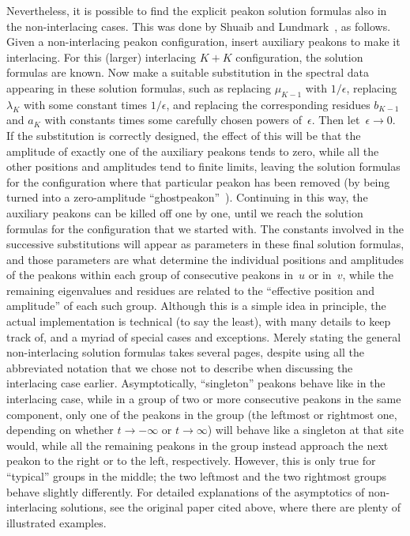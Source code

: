 \documentclass[10pt,a4paper]{article} \pdfoutput=1 
\begin{document}
Nevertheless, it is possible to find the explicit peakon solution formulas also in the
non-interlacing cases. This was done by Shuaib and
Lundmark~\cite{shuaib-lundmark:2019:GX-noninterlacing},
as follows.
Given a non-interlacing peakon configuration, insert auxiliary peakons
to make it interlacing.
For this (larger) interlacing $K+K$ configuration, the solution formulas are known.
Now make a suitable substitution in the spectral data appearing in these solution
formulas, such as replacing $\mu_{K-1}$ with $1/\epsilon$,
replacing $\lambda_K$ with some constant times $1/\epsilon$,
and replacing the corresponding residues $b_{K-1}$ and $a_K$ with
constants times some carefully chosen powers of~$\epsilon$.
Then let~$\epsilon \to 0$.
If the substitution is correctly designed, the effect of this will be that the amplitude of
exactly one of the auxiliary peakons tends to zero, while all the other positions and
amplitudes tend to finite limits,
leaving the solution formulas for the configuration where that particular peakon has been removed
(by being turned into a zero-amplitude ``ghostpeakon''~\cite{lundmark-shuaib:2019:ghostpeakons}).
Continuing in this way, the auxiliary peakons can be killed off one by one,
until we reach the solution formulas for the configuration that we started with.
The constants involved in the successive substitutions will appear as
parameters in these final solution formulas,
and those parameters are what determine the individual positions and amplitudes
of the peakons within each group of consecutive peakons in~$u$ or in~$v$,
while the remaining eigenvalues and residues are related to the ``effective position
and amplitude'' of each such group.
Although this is a simple idea in principle,
the actual implementation is technical (to say the least),
with many details to keep track of,
and a myriad of special cases and exceptions.
Merely stating the general non-interlacing solution formulas takes several pages,
despite using all the abbreviated notation that we chose not to describe
when discussing the interlacing case earlier.
Asymptotically, ``singleton'' peakons behave like in the interlacing case,
while in a group of two or more consecutive peakons in the same component,
only one of the peakons in the group (the leftmost or rightmost one, depending on
whether $t \to -\infty$ or $t \to \infty$)
will behave like a singleton at that site would, while all the remaining peakons in the
group instead approach the next peakon to the right or to the left, respectively.
However, this is only true for ``typical'' groups in the middle;
the two leftmost and the two rightmost groups behave slightly differently.
For detailed explanations of the asymptotics of non-interlacing solutions,
see the original paper cited above, where there are plenty of illustrated examples.
\end{document}
